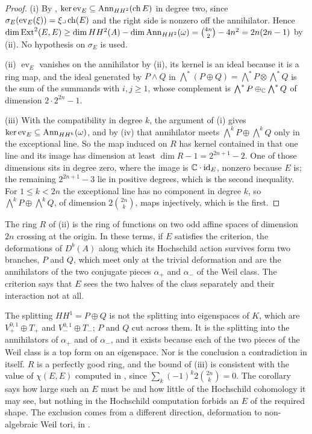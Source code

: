 \begin{proof}
(i) By , $\ker\operatorname{ev}_{E}\subseteq\operatorname{Ann}_{HH^{2}}(\operatorname{ch} E)$
in degree two, since $\sigma_{E}(\operatorname{ev}_{E}(\xi))=\xi\lrcorner\operatorname{ch}(E)$
and the right side is nonzero off the annihilator. Hence
$\dim\operatorname{Ext}^{2}(E,E)\ge\dim HH^{2}(A)-\dim\operatorname{Ann}_{HH^{2}}(\omega)
=\binom{4n}{2}-4n^{2}=2n(2n-1)$ by (ii). No hypothesis
on $\sigma_{E}$ is used.

(ii) $\operatorname{ev}_{E}$ vanishes on the annihilator by
(ii), its kernel is an ideal because it is a ring map, and
the ideal generated by $P\wedge Q$ in $\bigwedge^{*}(P\oplus Q)
=\bigwedge^{*}P\otimes\bigwedge^{*}Q$ is the sum of the summands with
$i,j\ge1$, whose complement is $\bigwedge^{*}P\oplus_{\mathbb{C}}\bigwedge^{*}Q$ of
dimension $2\cdot2^{2n}-1$.

(iii) With the compatibility in degree $k$, the argument of (i) gives
$\ker\operatorname{ev}_{E}\subseteq\operatorname{Ann}_{HH^{k}}(\omega)$, and by
(iv) that annihilator meets $\bigwedge^{k}P\oplus
\bigwedge^{k}Q$ only in the exceptional line. So the map induced on $R$ has
kernel contained in that one line and its image has dimension at least
$\dim R-1=2^{2n+1}-2$. One of those dimensions sits in degree zero, where the
image is $\mathbb{C}\cdot\operatorname{id}_{E}$, nonzero because $E$ is; the remaining
$2^{2n+1}-3$ lie in positive degrees, which is the second inequality. For
$1\le k<2n$ the exceptional line has no component in degree $k$, so
$\bigwedge^{k}P\oplus\bigwedge^{k}Q$, of dimension $2\binom{2n}{k}$, maps
injectively, which is the first.
\end{proof}

\begin{remark}\label{rem:twobranches}
The ring $R$ of (ii) is the ring of functions on two odd
affine spaces of dimension $2n$ crossing at the origin. In these terms, if $E$
satisfies the criterion, the deformations of $D^{b}(A)$ along which its
Hochschild action survives form two branches, $P$ and $Q$, which meet only at
the trivial deformation and are the annihilators of the two conjugate pieces
$\alpha_{+}$ and $\alpha_{-}$ of the Weil class. The criterion says that $E$
sees the two halves of the class separately and their interaction not at all.

The splitting $HH^{1}=P\oplus Q$ is not the splitting into eigenspaces of
$K$, which are $V_{+}^{0,1}\oplus T_{+}$ and $V_{-}^{0,1}\oplus T_{-}$; $P$
and $Q$ cut across them. It is the splitting into the annihilators of
$\alpha_{+}$ and of $\alpha_{-}$, and it exists because each of the two
pieces of the Weil class is a top form on an eigenspace. Nor is the
conclusion a contradiction in itself. $R$ is a perfectly good ring, and the
bound of (iii) is consistent with the value of $\chi(E,E)$ computed in
\cite[Proposition~9.11]{paperI}, since $\sum_{k}(-1)^{k}2\binom{2n}{k}=0$. The
corollary says how large such an $E$ must be and how little of the Hochschild
cohomology it may see, but nothing in the Hochschild computation forbids an
$E$ of the required shape. The exclusion comes from a different direction,
deformation to non-algebraic Weil tori, in .
\end{remark}

